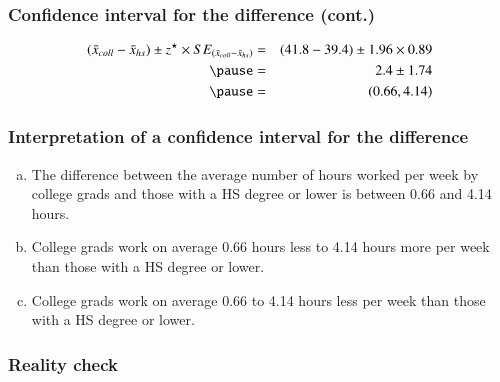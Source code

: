 
\begin{frame}
\frametitle{Confidence interval for the difference (cont.)}


\pause

\begin{eqnarray*}
(\bar{x}_{coll} - \bar{x}_{hs}) \pm z^\star \times SE_{(\bar{x}_{coll} - \bar{x}_{hs})} &=& (41.8 - 39.4) \pm 1.96 \times 0.89 \\
\pause
&=& 2.4 \pm 1.74 \\
\pause
&=& (0.66, 4.14)
\end{eqnarray*}


\end{frame}


\begin{frame}
\frametitle{Interpretation of a confidence interval for the difference}


\begin{enumerate}[(a)]
\item The difference between the average number of hours worked per week by college grads and those with a HS degree or lower is between 0.66 and 4.14 hours.
\item College grads work on average 0.66 hours less to 4.14 hours more per week than those with a HS degree or lower.
\item College grads work on average 0.66 to 4.14 hours less per week than those with a HS degree or lower.
\end{enumerate}

\end{frame}


\begin{frame}
\frametitle{Reality check}


\end{frame}



